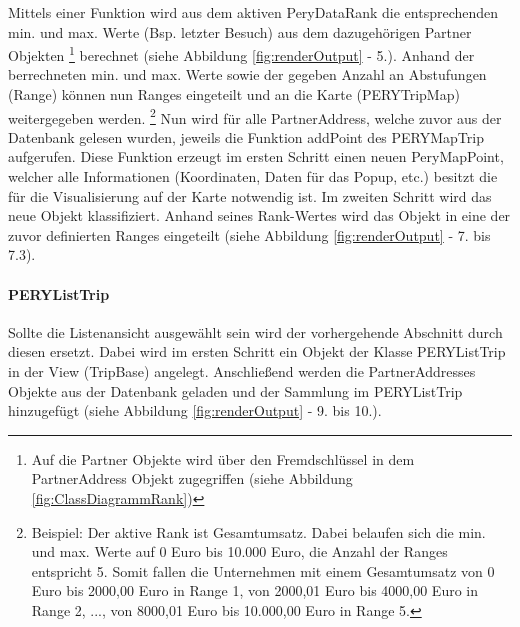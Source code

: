 \documentclass[Bachelorarbeit.tex]{subfiles}
\begin{document}
Mittels einer Funktion wird aus dem aktiven PeryDataRank die entsprechenden min. und max. Werte (Bsp. letzter Besuch) aus dem dazugehörigen Partner Objekten
	\footnote{Auf die Partner Objekte wird über den Fremdschlüssel in dem PartnerAddress Objekt zugegriffen (siehe Abbildung \ref{fig:ClassDiagrammRank})}  
berechnet (siehe Abbildung \ref{fig:renderOutput} - 5.).
Anhand der berrechneten min. und max. Werte sowie der gegeben Anzahl an Abstufungen (Range) können nun Ranges eingeteilt und an die Karte (PERYTripMap) weitergegeben werden.
	\footnote{Beispiel: Der aktive Rank ist Gesamtumsatz. Dabei belaufen sich die min. und max. Werte auf 0 Euro bis 10.000 Euro, die Anzahl der Ranges entspricht 5. Somit fallen die Unternehmen mit einem Gesamtumsatz von 0 Euro bis 2000,00 Euro in Range 1, von 2000,01 Euro bis 4000,00 Euro in Range 2, ..., von 8000,01 Euro bis 10.000,00 Euro in Range 5.} 
Nun wird für alle PartnerAddress, welche zuvor aus der Datenbank gelesen wurden, jeweils die Funktion addPoint des PERYMapTrip  aufgerufen. 
Diese Funktion erzeugt im ersten Schritt einen neuen PeryMapPoint, welcher alle Informationen (Koordinaten, Daten für das Popup, etc.) besitzt die für die Visualisierung auf der Karte notwendig ist.
Im zweiten Schritt wird das neue Objekt klassifiziert.  
Anhand seines Rank-Wertes wird das Objekt in eine der zuvor definierten Ranges eingeteilt (siehe Abbildung \ref{fig:renderOutput} - 7. bis 7.3).

\paragraph{PERYListTrip}
\label{PERYListTrip}
Sollte die Listenansicht ausgewählt sein wird der vorhergehende Abschnitt durch diesen ersetzt.
Dabei wird im ersten Schritt ein Objekt der Klasse PERYListTrip in der View (TripBase) angelegt.
Anschließend werden die PartnerAddresses Objekte aus der Datenbank geladen und der Sammlung im PERYListTrip hinzugefügt (siehe Abbildung \ref{fig:renderOutput} - 9. bis 10.).
\end{document}
